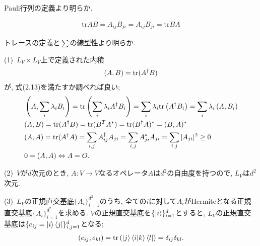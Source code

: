 \begin{ex}
    \label{ex2.36}
    Pauli行列の定義より明らか.
\end{ex}

\begin{ex}
    \label{ex2.37}
    \begin{align*}
        \mathrm{tr}{AB} = A_{ij}B_{ji} =  A_{ij}B_{ji} = \mathrm{tr}{BA}
    \end{align*}
\end{ex}

\begin{ex}
    \label{ex2.38}
    トレースの定義と$\sum$の線型性より明らか.
\end{ex}

\begin{ex}
    \label{ex2.39}
    (1)\
    $L_V \times L_V$上で定義された内積
    \begin{align*}
        \left( A, B\right) = \mathrm{tr}(A^\dagger B)
    \end{align*}
    が, 式(2.13)を満たすか調べれば良い;
    \begin{align*}
         & \left( A, \sum_i \lambda_i B_i \right)
        =
        \mathrm{tr}\left(\sum_i \lambda_i A^\dagger B_i \right)
        =
        \sum_i \lambda_i  \mathrm{tr} \left(A^\dagger B_i \right)
        =
        \sum_i \lambda_i  \left( A, B_i \right)
        \\
         & (A, B) = \mathrm{tr}(A^\dagger B) = \mathrm{tr}( B^T A^*) = \mathrm{tr}( B^\dagger A)^* = (B, A)^*
        \\
         &
        (A,A) = \mathrm{tr}(A^\dagger A)
        =
        \sum_{i,j} A^\dagger_{ij} A_{ji}
        =
        \sum_{i,j} A^*_{ji} A_{ji}
        =
        \sum_{i,j} | A_{ji}|^2
        \geq 0
        \\
         &
        0 = (A,A) \Leftrightarrow A = O .
    \end{align*}
    \par
    (2)\ $V$が$d$次元のとき, $A: V \to V$なるオペレータ$A$は$d^2$の自由度を持つので,
    $L_V$は$d^2$次元.
    \par
    (3)\ $L_V$の正規直交基底$\{A_i\}_{i=1}^{d^2}$のうち, 全ての$i$に対して$A_i$がHermiteとなる正規直交基底$\{A_i\}_{i=1}^{d^2}$を求める. $V$の正規直交基底を$\{\ket{i}\}_{i=1}^{d}$とすると, $L_V$の正規直交基底は$\{e_{ij}=\ket{i} \bra{j}\}_{i,j=1}^{d}$となる;
    \begin{align*}
        \left( e_{ij}, e_{kl} \right) = \mathrm{tr}\left(\ket{j} \braket{i|k} \bra{l} \right) = \delta_{ij} \delta_{kl}.
    \end{align*}

\end{ex}
